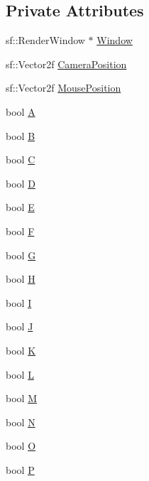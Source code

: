 \subsection*{Private Attributes}
\begin{DoxyCompactItemize}
\item 
sf\-::\-Render\-Window $\ast$ \hyperlink{class_update_data_a55a408e4c722338ac61cc8d53ae704d2}{Window}
\item 
sf\-::\-Vector2f \hyperlink{class_update_data_a365c2ac748b6456a70786698bef446e9}{Camera\-Position}
\item 
sf\-::\-Vector2f \hyperlink{class_update_data_a40d92c0ffa2a72c0610e9f1df2362bda}{Mouse\-Position}
\item 
bool \hyperlink{class_update_data_a4cbd35c10d81c0e7212c25f92b42a835}{A}
\item 
bool \hyperlink{class_update_data_a3d017300c67923eb5d8d8e8c2e2719c5}{B}
\item 
bool \hyperlink{class_update_data_a23f886eeea49c94a131db994cf40cca5}{C}
\item 
bool \hyperlink{class_update_data_ad44f92d0cf0c0f4ca4ef841fa8799730}{D}
\item 
bool \hyperlink{class_update_data_a3796ef667286d4726522ffb579b9edee}{E}
\item 
bool \hyperlink{class_update_data_ac5025451e2be5ec6b47a35247d4d953b}{F}
\item 
bool \hyperlink{class_update_data_a47d61c6a49c0e5fffc7d0d60ff6791ab}{G}
\item 
bool \hyperlink{class_update_data_a3e086d6e0801eb54104a3d570b994cd8}{H}
\item 
bool \hyperlink{class_update_data_a728a86a7504a24c04fb691ed15cfdfc5}{I}
\item 
bool \hyperlink{class_update_data_a173b0417f5fd65d8008297b337640802}{J}
\item 
bool \hyperlink{class_update_data_aaf8d57b0ba3b41bb8d65640ef19e29c3}{K}
\item 
bool \hyperlink{class_update_data_aeea1a37f6373e6b43b8ec2175c2bf252}{L}
\item 
bool \hyperlink{class_update_data_ae983afdba92fce29a356d14400de0b5a}{M}
\item 
bool \hyperlink{class_update_data_a89a519896ff2bc4b41eef42b6c176b57}{N}
\item 
bool \hyperlink{class_update_data_aa81cb7f08aad4fd6992a4017819e7d7e}{O}
\item 
bool \hyperlink{class_update_data_ae67b4fb9a68ea7559aec9e3e6d84a3d9}{P}

\end{DoxyCompactItemize}
